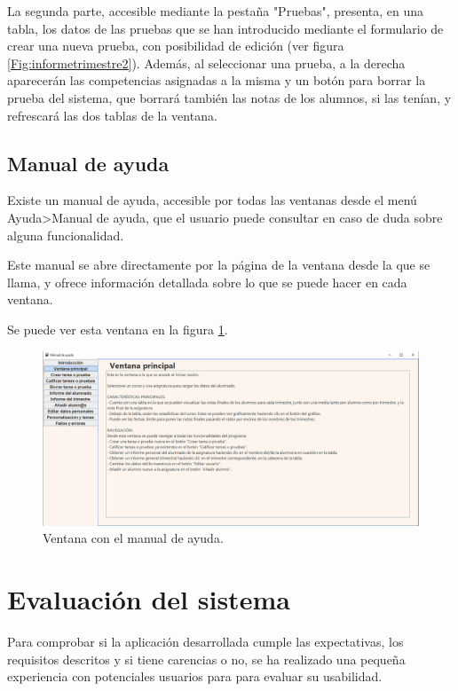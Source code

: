 La segunda parte, accesible mediante la pestaña "Pruebas", presenta, en una tabla, los datos de las pruebas que se han introducido mediante el formulario de crear una nueva prueba, con posibilidad de edición (ver figura \ref{Fig:informetrimestre2}). Además, al seleccionar una prueba, a la derecha aparecerán las competencias asignadas a la misma y un botón para borrar la prueba del sistema, que borrará también las notas de los alumnos, si las tenían, y refrescará las dos tablas de la ventana.

\subsection{Manual de ayuda}
Existe un manual de ayuda, accesible por todas las ventanas desde el menú Ayuda>Manual de ayuda, que el usuario puede consultar en caso de duda sobre alguna funcionalidad.

Este manual se abre directamente por la página de la ventana desde la que se llama, y ofrece información detallada sobre lo que se puede hacer en cada ventana.

Se puede ver esta ventana en la figura \ref{Fig:ayuda}.

\begin{figure}[h]
\centering\includegraphics[width=1\linewidth]{figs/ayuda.png}
\caption{Ventana con el manual de ayuda.}
\label{Fig:ayuda}
\end{figure}

\section{Evaluación del sistema}
\label{sub:pruebausabilidad}
Para comprobar si la aplicación desarrollada cumple las expectativas, los requisitos descritos y si tiene carencias o no, se ha realizado una pequeña experiencia con potenciales usuarios para para evaluar su usabilidad.

